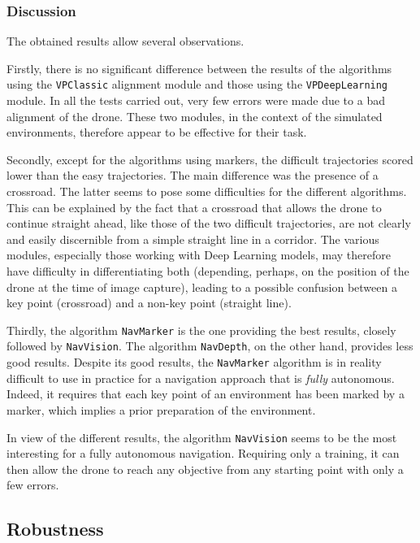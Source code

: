 \subsubsection{Discussion}

The obtained results allow several observations.

Firstly, there is no significant difference between the results of the algorithms using the \texttt{VPClassic} alignment module and those using the \texttt{VPDeepLearning} module. In all the tests carried out, very few errors were made due to a bad alignment of the drone. These two modules, in the context of the simulated environments, therefore appear to be effective for their task.

Secondly, except for the algorithms using markers, the difficult trajectories scored lower than the easy trajectories. The main difference was the presence of a crossroad. The latter seems to pose some difficulties for the different algorithms. This can be explained by the fact that a crossroad that allows the drone to continue straight ahead, like those of the two difficult trajectories, are not clearly and easily discernible from a simple straight line in a corridor. The various modules, especially those working with Deep Learning models, may therefore have difficulty in differentiating both (depending, perhaps, on the position of the drone at the time of image capture), leading to a possible confusion between a key point (crossroad) and a non-key point (straight line).

Thirdly, the algorithm \texttt{NavMarker} is the one providing the best results, closely followed by \texttt{NavVision}. The algorithm \texttt{NavDepth}, on the other hand, provides less good results. Despite its good results, the \texttt{NavMarker} algorithm is in reality difficult to use in practice for a navigation approach that is \emph{fully} autonomous. Indeed, it requires that each key point of an environment has been marked by a marker, which implies a prior preparation of the environment.

In view of the different results, the algorithm \texttt{NavVision} seems to be the most interesting for a fully autonomous navigation. Requiring only a training, it can then allow the drone to reach any objective from any starting point with only a few errors.

\subsection{Robustness}\label{sec:06.robustness}

